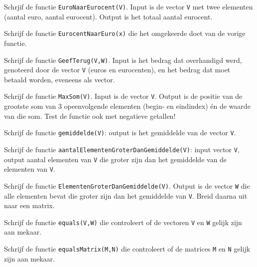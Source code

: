 \begin{oef}
Schrjif de functie \verb/EuroNaarEurocent(V)/. Input is de vector \verb/V/ met twee elementen (aantal euro, aantal eurocent). Output is het totaal aantal eurocent.
\end{oef}
\begin{oef}
Schrijf de functie \verb/EurocentNaarEuro(x)/ die het omgekeerde doet van de vorige functie.
\item Schrijf de functie \verb/GeefTerug(V,W)/. Input is het bedrag dat overhandigd werd, genoteerd door de vector \verb/V/ (euros en eurocenten), en het bedrag dat moet betaald worden, eveneens als vector.
\end{oef}
\begin{oef}
Schrijf de functie \verb/MaxSom(V)/. Input is de vector \verb/V/. Output is de positie van de grootste som van 3 opeenvolgende elementen (begin- en eindindex) én de waarde van die som. Test de functie ook met negatieve getallen!
\end{oef}
\begin{oef}
Schrijf de functie \verb/gemiddelde(V)/: output is het gemiddelde van de vector \verb/V/.
\end{oef}
\begin{oef}
Schrijf de functie \verb/aantalElementenGroterDanGemiddelde(V)/: input vector \verb/V/, output aantal elementen van \verb/V/ die groter zijn dan het gemiddelde van de elementen van \verb/V/.
\end{oef}
\begin{oef}
Schrijf de functie \verb/ElementenGroterDanGemiddelde(V)/. Output is de vector \verb/W/ die alle elementen bevat die groter zijn dan het gemiddelde van \verb/V/. Breid daarna uit naar een matrix.
\end{oef}
\begin{oef}
Schrijf de functie \verb/equals(V,W)/ die controleert of de vectoren \verb/V/ en \verb/W/ gelijk zijn aan mekaar.
\end{oef}
\begin{oef}
Schrijf de functie \verb/equalsMatrix(M,N)/ die controleert of de matrices \verb/M/ en \verb/N/ gelijk zijn aan mekaar.
\end{oef}


